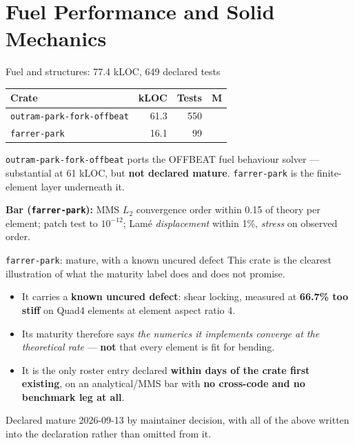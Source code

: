 \documentclass[aspectratio=169]{beamer}
\newcommand{\statustab}[1]{{\footnotesize\setlength{\tabcolsep}{4pt}#1}}
\begin{document}
\section{Fuel Performance and Solid Mechanics}

\begin{frame}{Fuel and structures: 77.4 kLOC, 649 declared tests}
    \statustab{
    \begin{tabular}{lrrc}
        \toprule
        \textbf{Crate} & \textbf{kLOC} & \textbf{Tests} & \textbf{M} \\
        \midrule
        \texttt{outram-park-fork-offbeat} & 61.3 & 550 & \\
        \texttt{farrer-park}              & 16.1 &  99 & \checkmark \\
        \bottomrule
    \end{tabular}}

    \medskip
    \texttt{outram-park-fork-offbeat} ports the OFFBEAT fuel behaviour solver
    \parencite{scolaro2020offbeat} --- substantial at 61 kLOC, but
    \textbf{not declared mature}. \texttt{farrer-park} is the finite-element
    layer underneath it.

    \medskip
    \textbf{Bar (\texttt{farrer-park}):} MMS $L_2$ convergence order within
    0.15 of theory per element; patch test to $10^{-12}$; Lam\'e
    \emph{displacement} within 1\%, \emph{stress} on observed order.
\end{frame}

\begin{frame}{\texttt{farrer-park}: mature, with a known uncured defect}
    This crate is the clearest illustration of what the maturity label does and
    does not promise.

    \medskip
    \begin{itemize}
        \item It carries a \textbf{known uncured defect}: shear locking,
              measured at \textbf{66.7\% too stiff} on Quad4 elements at
              element aspect ratio 4.
        \item Its maturity therefore says \emph{the numerics it implements
              converge at the theoretical rate} --- \textbf{not} that every
              element is fit for bending.
        \item It is the only roster entry declared \textbf{within days of the
              crate first existing}, on an analytical/MMS bar with
              \textbf{no cross-code and no benchmark leg at all}.
    \end{itemize}

    \medskip
    Declared mature 2026-09-13 by maintainer decision, with all of the above
    written into the declaration rather than omitted from it.
\end{frame}
\end{document}
